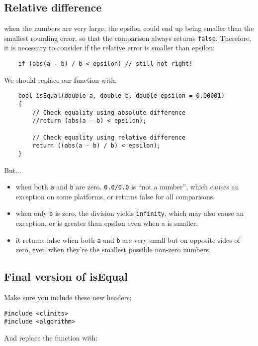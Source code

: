 \documentclass[english,a4paper,12pt,oneside]{article}
\begin{document}
\subsection*{Relative difference}

when the numbers are very large, the epsilon could end up being smaller than the smallest rounding error, so that the comparison always returns \verb+false+. 
Therefore, it is necessary to consider if the relative error is smaller than epsilon:

\begin{lstlisting}
    if (abs(a - b) / b < epsilon) // still not right!
\end{lstlisting}

We should replace our function with:

\begin{lstlisting}
    bool isEqual(double a, double b, double epsilon = 0.00001)
    {
        // Check equality using absolute difference
        //return (abs(a - b) < epsilon);

        // Check equality using relative difference
        return ((abs(a - b) / b) < epsilon);
    }
\end{lstlisting}


But...
\begin{itemize}
 \item     when both \verb+a+ and \verb+b+ are zero. \verb+0.0/0.0+ is ``not a number'', which causes an exception on some platforms, or returns false for all comparisons.
 \item     when only \verb+b+ is zero, the division yields \verb+infinity+, which may also cause an exception, or is greater than epsilon even when a is smaller.
 \item     it returns false when both \verb+a+ and \verb+b+ are very small but on opposite sides of zero, even when they’re the smallest possible non-zero numbers.
\end{itemize}


\subsection*{Final version of isEqual}

Make sure you include these new headers:
\begin{lstlisting}
#include <climits>
#include <algorithm>
\end{lstlisting}

And replace the function with:
\end{document}
